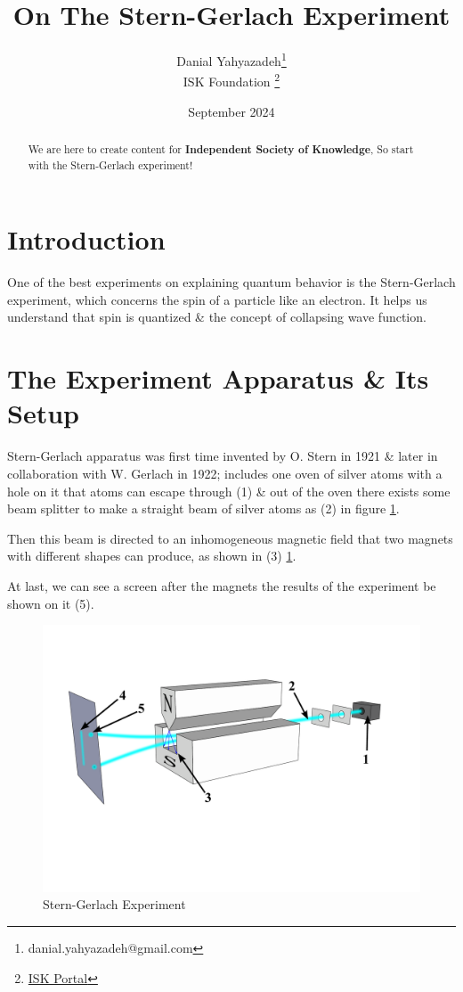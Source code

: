 \documentclass{article}
\title{On The Stern-Gerlach Experiment}
\author{Danial Yahyazadeh\footnote{danial.yahyazadeh@gmail.com}\\ 
\small{
ISK Foundation}%
\footnote{\href{https://iskportal.com/}{ISK Portal}}
}
\date{September 2024}
\begin{document}
\maketitle

\begin{abstract}
    We are here to create content for \textbf{Independent Society of Knowledge}, So start with the Stern-Gerlach experiment!
\end{abstract}

\section{Introduction}
One of the best experiments on explaining quantum behavior is the Stern-Gerlach experiment, which concerns the spin of a particle like an electron. It helps us understand that spin is quantized \& the concept of collapsing wave function.

\section{The Experiment Apparatus \& Its Setup}
Stern-Gerlach apparatus was first time invented  by O. Stern in 1921  \& later in collaboration with W. Gerlach in 1922; includes one oven of silver atoms with a hole on it that atoms can escape through (1) \& out of the oven there exists some beam splitter to make a straight beam of silver atoms as (2) in figure
\ref{Stern-Gerlach Experiment}.

Then this beam is directed to an inhomogeneous magnetic field that two magnets with different shapes can produce, as shown in (3) \ref{Stern-Gerlach Experiment}.

At last, we can see a screen after the magnets the results of the experiment be shown on it (5).
\begin{figure}[h]
    \centering
    \includegraphics[width=0.5\linewidth]{Stern-Gerlach_experiment_svg.pdf}
    \caption{Stern-Gerlach Experiment}
    \label{Stern-Gerlach Experiment}
\end{figure}
\end{document}
